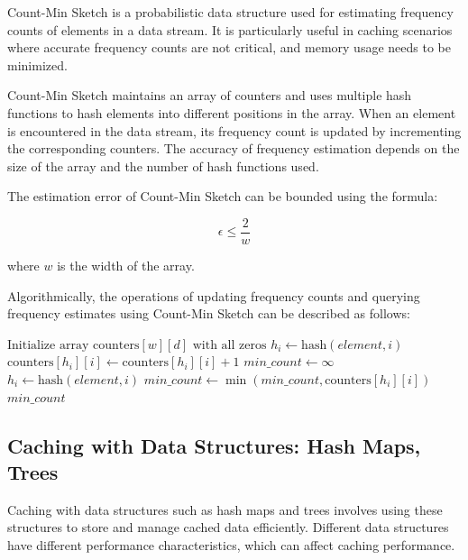 \documentclass[12pt]{book} %
\begin{document}
Count-Min Sketch is a probabilistic data structure used for estimating frequency counts of elements in a data stream. It is particularly useful in caching scenarios where accurate frequency counts are not critical, and memory usage needs to be minimized.

Count-Min Sketch maintains an array of counters and uses multiple hash functions to hash elements into different positions in the array. When an element is encountered in the data stream, its frequency count is updated by incrementing the corresponding counters. The accuracy of frequency estimation depends on the size of the array and the number of hash functions used.

The estimation error of Count-Min Sketch can be bounded using the formula:

\[
\epsilon \leq \frac{2}{w}
\]

where \(w\) is the width of the array.

Algorithmically, the operations of updating frequency counts and querying frequency estimates using Count-Min Sketch can be described as follows:
\FloatBarrier
\begin{algorithm}[H]
\caption{Count-Min Sketch Operations}
\begin{algorithmic}[1]
\State $\text{Initialize array } \text{counters}[w][d] \text{ with all zeros}$
        \State $h_i \gets \text{hash}(element, i)$ 
        \State $\text{counters}[h_i][i] \gets \text{counters}[h_i][i] + 1$ 
    \EndFor
\EndProcedure
{}
    \State $min\_count \gets \infty$
        \State $h_i \gets \text{hash}(element, i)$ 
        \State $min\_count \gets \min(min\_count, \text{counters}[h_i][i])$ 
    \EndFor
    \State \Return $min\_count$
\EndProcedure
\end{algorithmic}
\end{algorithm}
\FloatBarrier

\subsection{Caching with Data Structures: Hash Maps, Trees}

Caching with data structures such as hash maps and trees involves using these structures to store and manage cached data efficiently. Different data structures have different performance characteristics, which can affect caching performance.
\end{document}
